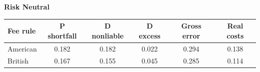 \documentclass[10pt,border=5pt,varwidth=17cm]{standalone}
\begin{document}
\begingroup
\small
\setlength{\tabcolsep}{5pt}
\renewcommand{\arraystretch}{1.20}
\noindent\textbf{Risk Neutral}\par\smallskip
\noindent\begin{tabularx}{\linewidth}{@{}>{\raggedright\arraybackslash}Xccccc@{}}
\toprule
\textbf{Fee rule} & \textbf{P shortfall} & \textbf{D nonliable} & \textbf{D excess} & \textbf{Gross error} & \textbf{Real costs} \\
\midrule
American & 0.182 & 0.182 & 0.022 & 0.294 & 0.138 \\
British & 0.167 & 0.155 & 0.045 & 0.285 & 0.114 \\
\bottomrule\end{tabularx}\par\medskip
\endgroup
\end{document}
